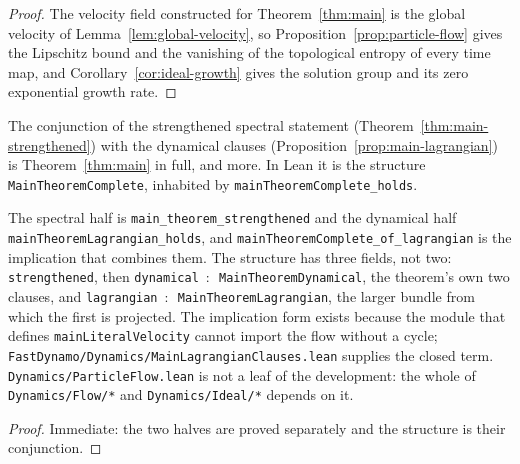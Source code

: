\begin{proof}
  \leanok
  The velocity field constructed for Theorem~\ref{thm:main} is the global velocity of
  Lemma~\ref{lem:global-velocity}, so Proposition~\ref{prop:particle-flow} gives the
  Lipschitz bound and the vanishing of the topological entropy of every time map, and
  Corollary~\ref{cor:ideal-growth} gives the solution group and its zero exponential growth
  rate.
\end{proof}

\begin{theorem}
  \label{thm:main-complete}
  \leanok
  The conjunction of the strengthened spectral statement
  (Theorem~\ref{thm:main-strengthened}) with the dynamical clauses
  (Proposition~\ref{prop:main-lagrangian}) is Theorem~\ref{thm:main} in full, and more.
  In Lean it is the structure \texttt{MainTheoremComplete}, inhabited by
  \texttt{mainTheoremComplete\_holds}.
\end{theorem}

The spectral half is
\texttt{main\_theorem\_strengthened} and the dynamical half
\texttt{mainTheoremLagrangian\_holds}, and
\texttt{mainTheoremComplete\_of\_lagrangian} is the implication that combines them.  The
structure has three fields, not two: \texttt{strengthened}, then
\texttt{dynamical}~$:$~\texttt{MainTheoremDynamical}, the theorem's own two clauses,
and \texttt{lagrangian}~$:$~\texttt{MainTheoremLagrangian}, the larger bundle from which the
first is projected.  The implication form exists because the
module that defines \texttt{mainLiteralVelocity} cannot import the flow without a cycle;
\texttt{FastDynamo/Dynamics/MainLagrangianClauses.lean} supplies the closed term.
\texttt{Dynamics/ParticleFlow.lean} is not a leaf of the development: the whole of
\texttt{Dynamics/Flow/*} and \texttt{Dynamics/Ideal/*} depends on it.

\begin{proof}
  \leanok
  Immediate: the two halves are proved separately and the structure is their conjunction.
\end{proof}


